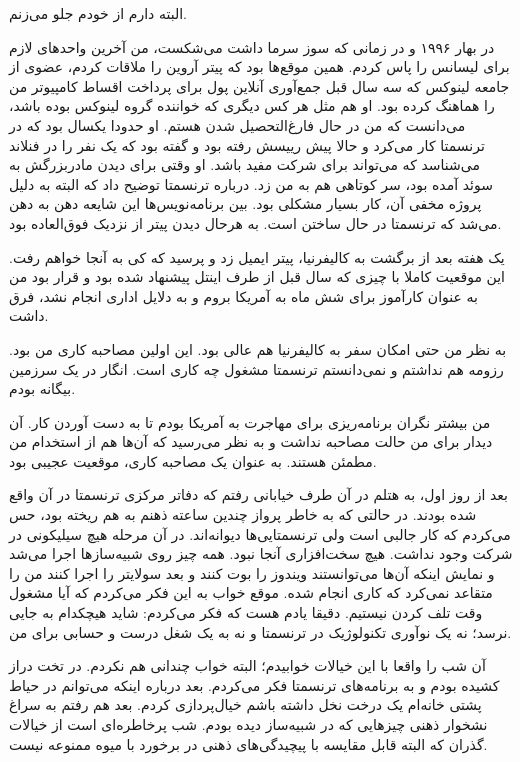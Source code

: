 البته دارم از خودم جلو می‌زنم.

در بهار ۱۹۹۶ و در زمانی که سوز سرما داشت می‌شکست، من آخرین واحدهای لازم
برای لیسانس را پاس کردم. همین موقع‌ها بود که پیتر آروین را ملاقات کردم،
عضوی از جامعه لینوکس که سه سال قبل جمع‌آوری آنلاین پول برای پرداخت
اقساط کامپیوتر من را هماهنگ کرده بود. او هم مثل هر کس دیگری که خواننده
گروه لینوکس بوده باشد، می‌دانست که من در حال فارغ‌التحصیل شدن هستم. او
حدودا یکسال بود که در ترنسمتا کار می‌کرد و حالا پیش رییسش رفته بود و
گفته بود که یک نفر را در فنلاند می‌شناسد که می‌تواند برای شرکت مفید
باشد. او وقتی برای دیدن مادربزرگش به سوئد آمده بود، سر کوتاهی هم به من
زد. درباره ترنسمتا توضیح داد که البته به دلیل پروژه مخفی آن، کار بسیار
مشکلی بود. بین برنامه‌نویس‌ها این شایعه دهن به دهن می‌شد که ترنسمتا در
حال ساختن  است. به هرحال دیدن پیتر از
نزدیک فوق‌العاده بود.

یک هفته بعد از برگشت به کالیفرنیا، پیتر ایمیل زد و پرسید که کی به آنجا
خواهم رفت. این موقعیت کاملا با چیزی که سال قبل از طرف اینتل پیشنهاد
شده بود و قرار بود من به عنوان کارآموز برای شش ماه به آمریکا بروم و به
دلایل اداری انجام نشد، فرق داشت.

به نظر من حتی امکان سفر به کالیفرنیا هم عالی بود. این اولین مصاحبه
کاری من بود. رزومه هم نداشتم و نمی‌دانستم ترنسمتا مشغول چه کاری
است. انگار در یک سرزمین بیگانه بودم.

من بیشتر نگران برنامه‌ریزی برای مهاجرت به آمریکا بودم تا به دست آوردن
کار. آن دیدار برای من حالت مصاحبه نداشت و به نظر می‌رسید که آن‌ها هم از
استخدام من مطمئن هستند. به عنوان یک مصاحبه کاری، موقعیت عجیبی بود.

بعد از روز اول، به هتلم در آن طرف خیابانی رفتم که دفاتر مرکزی ترنسمتا
در آن واقع شده بودند. در حالتی که به خاطر پرواز چندین ساعته ذهنم به هم
ریخته بود، حس می‌کردم که کار جالبی است ولی ترنسمتایی‌ها دیوانه‌اند. در آن
مرحله هیچ سیلیکونی در شرکت وجود نداشت. هیچ سخت‌افزاری آنجا نبود. همه
چیز روی شبیه‌سازها اجرا می‌شد و نمایش اینکه آن‌ها می‌توانستند ویندوز
 را بوت کنند و بعد سولایتر را اجرا کنند من را متقاعد نمی‌کرد
که کاری انجام شده. موقع خواب به این فکر می‌کردم که آیا مشغول وقت تلف
کردن نیستیم. دقیقا یادم هست که فکر می‌کردم: شاید هیچکدام به جایی نرسد؛
نه یک نوآوری تکنولوژیک در ترنسمتا و نه به یک شغل درست و حسابی برای من.

آن شب را واقعا با این خیالات خوابیدم؛ البته خواب چندانی هم نکردم. در
تخت دراز کشیده بودم و به برنامه‌های ترنسمتا فکر می‌کردم. بعد درباره
اینکه می‌توانم در حیاط پشتی خانه‌ام یک درخت نخل داشته باشم خیال‌پردازی
کردم. بعد هم رفتم به سراغ نشخوار ذهنی چیزهایی که در شبیه‌ساز دیده
بودم. شب پرخاطره‌ای است از خیالات گذران که البته قابل مقایسه با
پیچیدگی‌های ذهنی  در برخورد با میوه ممنوعه نیست.

